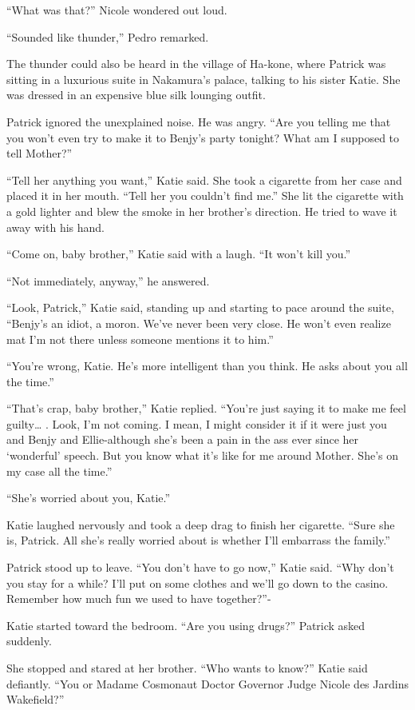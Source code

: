 \documentclass[]{article}
\begin{document}
{“What was that?” Nicole wondered out loud.

“Sounded like thunder,” Pedro remarked.

The thunder could also be heard in the village of Ha-kone, where Patrick was sitting in a luxurious suite in Nakamura’s palace, talking to his sister Katie. She was dressed in an expensive blue silk lounging outfit.

Patrick ignored the unexplained noise. He was angry. “Are you telling me that you won’t even try to make it to Benjy’s party tonight? What am I supposed to tell Mother?”

“Tell her anything you want,” Katie said. She took a cigarette from her case and placed it in her mouth. “Tell her you couldn’t find me.” She lit the cigarette with a gold lighter and blew the smoke in her brother’s direction. He tried to wave it away with his hand.

“Come on, baby brother,” Katie said with a laugh. “It won’t kill you.”

“Not immediately, anyway,” he answered.

“Look, Patrick,” Katie said, standing up and starting to pace around the suite, “Benjy’s an idiot, a moron. We’ve never been very close. He won’t even realize mat I’m not there unless someone mentions it to him.”

“You’re wrong, Katie. He’s more intelligent than you think. He asks about you all the time.”

“That’s crap, baby brother,” Katie replied. “You’re just saying it to make me feel guilty… . Look, I’m not coming. I mean, I might consider it if it were just you and Benjy and Ellie-although she’s been a pain in the ass ever since her ‘wonderful’ speech. But you know what it’s like for me around Mother. She’s on my case all the time.”

“She’s worried about you, Katie.”

Katie laughed nervously and took a deep drag to finish her cigarette. “Sure she is, Patrick. All she’s really worried about is whether I’ll embarrass the family.”

Patrick stood up to leave. “You don’t have to go now,” Katie said. “Why don’t you stay for a while? I’ll put on some clothes and we’ll go down to the casino. Remember how much fun we used to have together?”-

Katie started toward the bedroom. “Are you using drugs?” Patrick asked suddenly.

She stopped and stared at her brother. “Who wants to know?” Katie said defiantly. “You or Madame Cosmonaut Doctor Governor Judge Nicole des Jardins Wakefield?”

}
\end{document}
